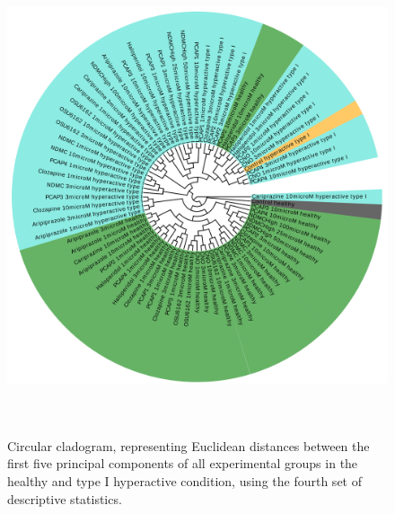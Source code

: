 \documentclass[a4paper,12pt]{article}
\begin{document}
\begin{figure}[h!]
\begin{center}
\includegraphics[width=14cm,height=14cm]{DarkApoHigh_set4_PCA_tree_A.png}
\caption{Circular cladogram, representing Euclidean distances between the first five principal components of all experimental groups in the healthy and type I hyperactive condition, using the fourth set of descriptive statistics.}
\end{center}
\end{figure}
\newpage
\end{document}
